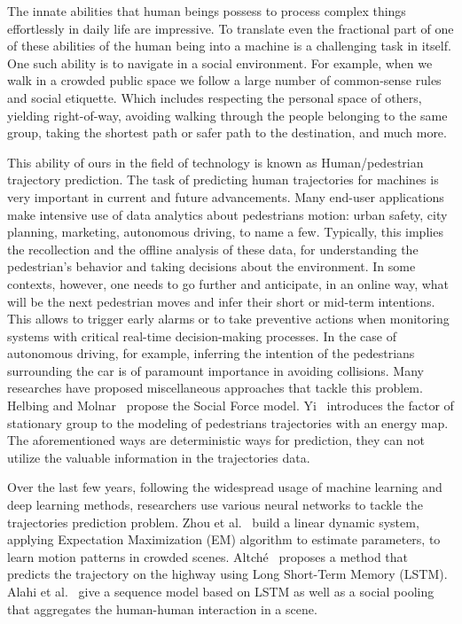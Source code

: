 The innate abilities that human beings possess to process complex things effortlessly in daily life are impressive. To translate even the fractional part of one of these abilities of the human being into a machine is a challenging task in itself. One such ability is to navigate in a social environment. For example, when we walk in a crowded public space we follow a large number of common-sense rules and social etiquette. Which includes respecting the personal space of others, yielding right-of-way, avoiding walking through the people belonging to the same group, taking the shortest path or safer path to the destination, and much more.

This ability of ours in the field of technology is known as Human/pedestrian trajectory prediction. The task of predicting human trajectories for machines is very important in current and future advancements. Many end-user applications make intensive use of data analytics about pedestrians motion: urban safety, city planning, marketing, autonomous driving, to name a few. Typically, this implies the recollection and the offline analysis of these data, for understanding the pedestrian's behavior and taking decisions about the environment.
In some contexts, however, one needs to go further and anticipate, in an online way, what will be the next pedestrian moves and infer their short or mid-term intentions. This allows to trigger early alarms or to take preventive actions when monitoring systems with critical real-time decision-making processes. In the case of autonomous driving, for example, inferring the intention of the pedestrians surrounding the car is of paramount importance in avoiding collisions. Many researches have proposed miscellaneous approaches that tackle this problem. Helbing and Molnar~\cite{Helbing95} propose the Social Force model. Yi~\cite{Yi15} introduces the factor of stationary group to the modeling of pedestrians trajectories with an energy map. The aforementioned ways are deterministic ways for prediction, they can not utilize the valuable information in the trajectories data.

Over the last few years, following the widespread usage of machine learning and deep learning methods, researchers use various neural networks to tackle the trajectories prediction problem. Zhou et al.~\cite{Zhou} build a linear dynamic system, applying Expectation Maximization (EM) algorithm to estimate parameters, to learn motion patterns in crowded scenes. Altché~\cite{Altche17} proposes a method that predicts the trajectory on the highway using Long Short-Term Memory (LSTM). Alahi et al.~\cite{Alahi16} give a sequence model based on LSTM as well as a social pooling that aggregates the human-human interaction in a scene.

